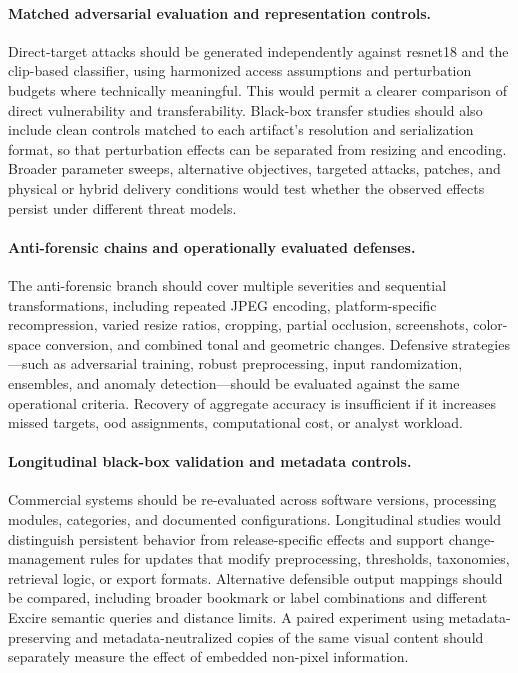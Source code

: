\paragraph{Matched adversarial evaluation and representation controls.}
Direct-target attacks should be generated independently against
\gls{resnet18} and the \gls{clip}-based classifier, using harmonized access
assumptions and perturbation budgets where technically meaningful. This would
permit a clearer comparison of direct vulnerability and transferability.
Black-box transfer studies should also include clean controls matched to each
artifact's resolution and serialization format, so that perturbation effects
can be separated from resizing and encoding. Broader parameter sweeps,
alternative objectives, targeted attacks, patches, and physical or hybrid
delivery conditions would test whether the observed effects persist under
different threat models.

\paragraph{Anti-forensic chains and operationally evaluated defenses.}
The anti-forensic branch should cover multiple severities and sequential
transformations, including repeated JPEG encoding, platform-specific
recompression, varied resize ratios, cropping, partial occlusion, screenshots,
color-space conversion, and combined tonal and geometric changes. Defensive
strategies---such as adversarial training, robust preprocessing, input
randomization, ensembles, and anomaly detection---should be evaluated against
the same operational criteria. Recovery of aggregate accuracy is insufficient
if it increases missed targets, \gls{ood} assignments, computational cost, or
analyst workload.

\paragraph{Longitudinal black-box validation and metadata controls.}
Commercial systems should be re-evaluated across software versions, processing
modules, categories, and documented configurations. Longitudinal studies would
distinguish persistent behavior from release-specific effects and support
change-management rules for updates that modify preprocessing, thresholds,
taxonomies, retrieval logic, or export formats. Alternative defensible output
mappings should be compared, including broader bookmark or label combinations
and different Excire semantic queries and distance limits. A paired experiment
using metadata-preserving and metadata-neutralized copies of the same visual
content should separately measure the effect of embedded non-pixel information.


